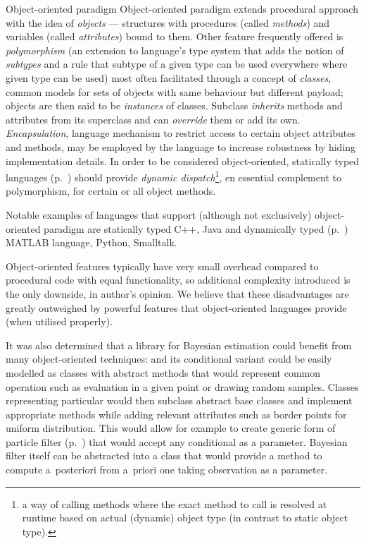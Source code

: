 \begin{subsection}{Object-oriented paradigm}
	Object-oriented paradigm extends procedural approach with the idea of \emph{objects} --- structures with procedures
	(called \emph{methods}) and variables (called \emph{attributes}) bound to them. Other
	feature frequently offered is \emph{polymorphism} (an extension to language's type
	system that adds the notion of \emph{subtypes} and a rule that subtype of a given type can
	be used everywhere where given type can be used) most often facilitated through a concept of
	\emph{classes}, common models for sets of objects with same behaviour but different
	payload; objects are then said to be \emph{instances} of classes. Subclass \emph{inherits}
	methods and attributes from its superclass and can \emph{override} them or add its own.
	\emph{Encapsulation}, language mechanism to restrict access to certain object attributes and
	methods, may be employed by the language to increase robustness by hiding implementation
	details. In order to be considered object-oriented, statically typed languages
	(p.~\pageref{desc:StaticTyping}) should provide \emph{dynamic dispatch}\footnote{a way of
	calling methods where the exact method to call is resolved at runtime based on actual (dynamic)
	object type (in contrast to static object type).}, en essential complement to polymorphism, for
	certain or all object methods.

	Notable examples of languages that support (although not exclusively) object-oriented
	paradigm are statically typed C++, Java and dynamically typed (p.~\pageref{desc:DynamicTyping})
	MATLAB language, Python, Smalltalk.

	Object-oriented features typically have very small overhead compared to procedural code with
	equal functionality, so additional complexity introduced is the only downside, in author's
	opinion. We believe that these disadvantages are greatly outweighed by powerful features
	that object-oriented languages provide (when utilised properly).

	It was also determined that
	a library for Bayesian estimation could benefit from many object-oriented techniques: {\pdf}
	and its conditional variant could be easily modelled as classes with abstract methods that
	would represent common operation such as evaluation in a given point or drawing random samples.
	Classes representing particular {\pdfs} would then subclass abstract base classes and implement
	appropriate methods while adding relevant attributes such as border points for uniform
	distribution. This would allow for example to create generic form of particle filter
	(p.~\pageref{sec:ParticleFilter}) that would accept any conditional {\pdf} as a parameter.
	Bayesian filter itself can be abstracted into a class that would provide a method to compute
	a~posteriori {\pdf} from a~priori one taking observation as a parameter.
\end{subsection}

